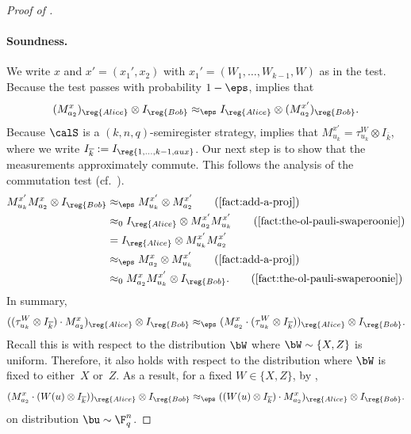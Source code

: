 \begin{proof}[Proof of ]
\paragraph{Soundness.}
We write $x$ and $x' = (x_1', x_2)$ with $x_1' = (W_1, \ldots, W_{k-1}, W)$ as in the test.
Because the test passes with probability $1-\eps$,  implies that
\begin{equation*}
(M_{a_2}^{x})_{\reg{Alice}} \otimes I_{\reg{Bob}}
\approx_{\eps} I_{\reg{Alice}} \otimes (M_{a_2}^{x'})_{\reg{Bob}}.
\end{equation*}
Because $\calS$ is a $(k,n,q)$-semiregister strategy, 
 implies that $M_{u_k}^{x'} = \tau^{W}_{u_k} \otimes I_{\overline{k}}$,
where we write $I_{\overline{k}} := I_{\reg{1, \ldots, k-1, aux}}$.
Our next step is to show that the measurements approximately commute.
This follows the analysis of the commutation test (cf.~\cite[Lemma 28]{CGJV18}).
\begin{align*}
M_{u_k}^{x'} M_{a_2}^{x} \otimes I_{\reg{Bob}}
&\approx_{\eps} M_{u_k}^{x'} \otimes M_{a_2}^{x'}\tag{\Cref{fact:add-a-proj}}\\
&\approx_{0} I_{\reg{Alice}} \otimes M_{a_2}^{x'}M_{u_k}^{x'} \tag{\Cref{fact:the-ol-pauli-swaperoonie}}\\
&= I_{\reg{Alice}} \otimes M_{u_k}^{x'}M_{a_2}^{x'}\\
&\approx_{\eps} M_{a_2}^{x} \otimes M_{u_k}^{x'}\tag{\Cref{fact:add-a-proj}}\\
&\approx_{0} M_{a_2}^x M_{u_k}^{x'} \otimes I_{\reg{Bob}}.\tag{\Cref{fact:the-ol-pauli-swaperoonie}}
\end{align*}
In summary,
\begin{equation*}
((\tau^{W}_{u_k} \otimes I_{\overline{k}})\cdot M_{a_2}^{x})_{\reg{Alice}} \otimes I_{\reg{Bob}}
\approx_{\eps} (M_{a_2}^x \cdot (\tau^{W}_{u_k} \otimes I_{\overline{k}}))_{\reg{Alice}}\otimes I_{\reg{Bob}}.
\end{equation*}
Recall this is with respect to the distribution $\bW$ where $\bW \sim \{X,Z\}$ is uniform.
Therefore, it also holds with respect to the distribution where $\bW$ is fixed to either~$X$ or~$Z$.
As a result, for a fixed $W \in \{X,Z\}$, by , 
\begin{equation*}
(M_{a_2}^x \cdot ( W(u)\otimes I_{\overline{k}}))_{\reg{Alice}} \otimes I_{\reg{Bob}}
\approx_{\eps} (( W(u)\otimes I_{\overline{k}}) \cdot M_{a_2}^x)_{\reg{Alice}} \otimes I_{\reg{Bob}}.
\end{equation*}
on distribution $\bu \sim \F_q^n$.

\end{proof}
